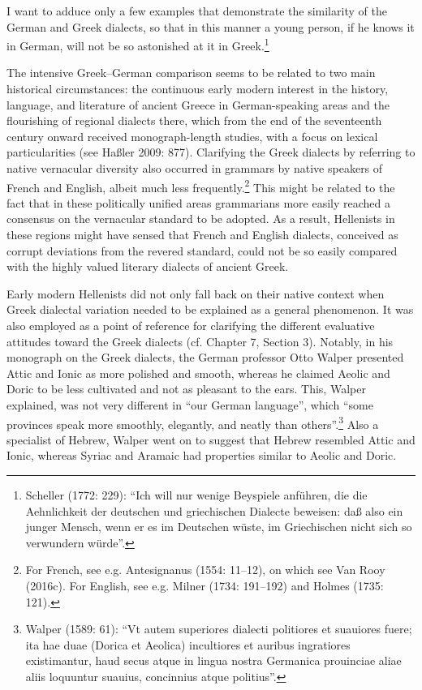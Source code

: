 \documentclass[12pt]{article}
\newenvironment{styleStandard}{\renewcommand\baselinestretch{1.25}\setlength\leftskip{0in}\setlength\rightskip{0in}\setlength\parindent{0.1972in}\setlength\parfillskip{0pt plus 1fil}\setlength\parskip{0in plus 1pt}\writerlistparindent\writerlistleftskip\leavevmode\normalfont\normalsize\writerlistlabel\ignorespaces}{\unskip\vspace{0in plus 1pt}\par}
\newenvironment{styleQuote}{\renewcommand\baselinestretch{1.25}\setlength\leftskip{0.3937in}\setlength\rightskip{0in}\setlength\parindent{0in}\setlength\parfillskip{0pt plus 1fil}\setlength\parskip{0.1665in plus 0.016649999in}\writerlistparindent\writerlistleftskip\leavevmode\normalfont\normalsize\writerlistlabel\ignorespaces}{\unskip\vspace{0.1665in plus 0.016649999in}\par}
\newcommand\writerlistleftskip{}
\newcommand\writerlistparindent{}
\newcommand\writerlistlabel{}
\begin{document}
\begin{styleQuote}
I want to adduce only a few examples that demonstrate the similarity of the German and Greek dialects, so that in this manner a young person, if he knows it in German, will not be so astonished at it in Greek.\footnote{ Scheller (1772: 229): “Ich will nur wenige Beyspiele anführen, die die Aehnlichkeit der deutschen und griechischen Dialecte beweisen: daß also ein junger Mensch, wenn er es im Deutschen wüste, im Griechischen nicht sich so verwundern würde”.}
\end{styleQuote}

\begin{styleStandard}
The intensive Greek–German comparison seems to be related to two main historical circumstances: the continuous early modern interest in the history, language, and literature of ancient Greece in German-speaking areas and the flourishing of regional dialects there, which from the end of the seventeenth century onward received monograph-length studies, with a focus on lexical particularities (see Haßler 2009: 877). Clarifying the Greek dialects by referring to native vernacular diversity also occurred in grammars by native speakers of French and English, albeit much less frequently.\footnote{ For French, see e.g. Antesignanus (1554: 11–12), on which see Van Rooy (2016c). For English, see e.g. Milner (1734: 191–192) and Holmes (1735: 121).} This might be related to the fact that in these politically unified areas grammarians more easily reached a consensus on the vernacular standard to be adopted. As a result, Hellenists in these regions might have sensed that French and English dialects, conceived as corrupt deviations from the revered standard, could not be so easily compared with the highly valued literary dialects of ancient Greek.
\end{styleStandard}

\begin{styleStandard}
Early modern Hellenists did not only fall back on their native context when Greek dialectal variation needed to be explained as a general phenomenon. It was also employed as a point of reference for clarifying the different evaluative attitudes toward the Greek dialects (cf. Chapter 7, Section 3). Notably, in his monograph on the Greek dialects, the German professor Otto Walper presented Attic and Ionic as more polished and smooth, whereas he claimed Aeolic and Doric to be less cultivated and not as pleasant to the ears. This, Walper explained, was not very different in “our German language”, which “some provinces speak more smoothly, elegantly, and neatly than others”.\footnote{ Walper (1589: 61): “Vt autem superiores dialecti politiores et suauiores fuere; ita hae duae (Dorica et Aeolica) incultiores et auribus ingratiores existimantur, haud secus atque in lingua nostra Germanica prouinciae aliae aliis loquuntur suauius, concinnius atque politius”.} Also a specialist of Hebrew, Walper went on to suggest that Hebrew resembled Attic and Ionic, whereas Syriac and Aramaic had properties similar to Aeolic and Doric.
\end{styleStandard}
\end{document}
